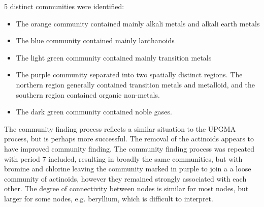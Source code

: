 5 distinct communities were identified:
\begin{itemize}
\itemsep-0.5em
\item The orange community contained mainly alkali metals and alkali earth metals
\item The blue community contained mainly lanthanoids
\item The light green community contained mainly transition metals
\item The purple community separated into two spatially distinct regions. The northern region generally contained transition metals and metalloid, and the southern region contained organic non-metals.
\item The dark green community contained noble gases.
\end{itemize}
The community finding process reflects a similar situation to the UPGMA process, but is perhaps more successful. The removal of the actinoids appears to have improved community finding. The community finding process was repeated with period 7 included, resulting in broadly the same communities, but with bromine and chlorine leaving the community marked in purple to join a a loose community of actinoids, however they remained strongly associated with each other. The degree of connectivity between nodes is similar for most nodes, but larger for some nodes, e.g. beryllium, which is difficult to interpret. 

